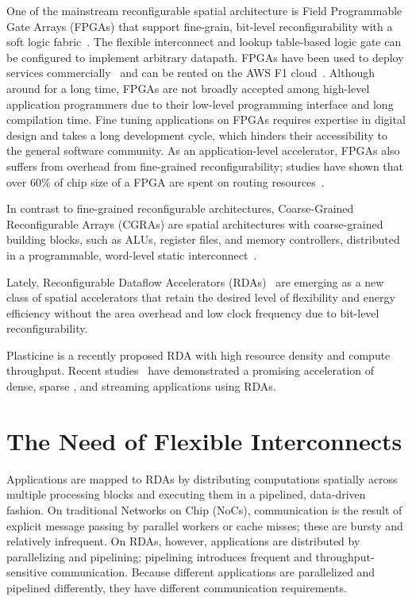 One of the mainstream reconfigurable spatial architecture is 
Field Programmable Gate Arrays (FPGAs) that support fine-grain, 
bit-level reconfigurability with a soft logic fabric~\cite{fpga-survey}.
The flexible interconnect and lookup table-based logic gate can be configured to implement arbitrary
datapath.
FPGAs have been used to deploy services commercially~\cite{microsoft, baidu, deephi} and can be rented on the AWS F1 cloud~\cite{aws}. 
Although around for a long time, FPGAs are not broadly accepted among high-level application programmers 
due to their low-level programming interface and long compilation time.
Fine tuning applications on FPGAs requires expertise in digital design and takes a long
development cycle, which hinders their accessibility to the general software community.
As an application-level accelerator, FPGAs also suffers from overhead from fine-grained reconfigurability; 
studies have shown that over 60\% of chip size of a FPGA are spent on routing 
resources~\cite{fpgaSurvey, calhoun, fpgaPower}. 

In contrast to fine-grained reconfigurable architectures,
Coarse-Grained Reconfigurable Arrays (CGRAs) are spatial architectures with 
coarse-grained building blocks, such as ALUs, register files, and memory controllers, 
distributed in a programmable, word-level static interconnect~\cite{adres, kress, dyser, piperench, tartan, 
hrl, hycube}.

Lately, Reconfigurable Dataflow Accelerators (RDAs)~\cite{plasticine, ti, streamdataflow,
neuflow,cnndataflow,dataflowarch} are emerging as a new class of spatial accelerators that 
retain the desired level of flexibility and energy efficiency without 
the area overhead and low clock frequency due to bit-level reconfigurability.

Plasticine is a recently proposed RDA with high resource density and compute throughput.
Recent studies~\cite{plasticine} have demonstrated a promising acceleration of dense, sparse
, and streaming applications using RDAs.


\section{The Need of Flexible Interconnects}
Applications are mapped to RDAs by distributing computations spatially across multiple processing blocks 
and executing them in a pipelined, data-driven fashion. On traditional Networks on Chip (NoCs), communication 
is the result of explicit message passing by parallel workers or cache misses; these are bursty and
relatively infrequent. On RDAs, however, applications are distributed by parallelizing and pipelining; 
pipelining introduces frequent and throughput-sensitive communication. Because different applications are 
parallelized and pipelined differently, they have different communication requirements.

